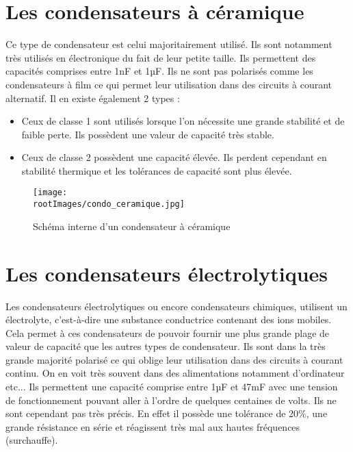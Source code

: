 \newpage
\section{Les condensateurs à céramique}

Ce type de condensateur est celui majoritairement utilisé. Ils sont notamment très utilisés en électronique du fait de leur petite taille. Ils permettent des capacités comprises entre 1nF et 1µF. Ils ne sont pas polarisés comme les condensateurs à film ce qui permet leur utilisation dans des circuits à courant alternatif. Il en existe également 2 types :\\

\begin{itemize}
    \item Ceux de classe 1 sont utilisés lorsque l’on nécessite une grande stabilité et de faible perte. Ils possèdent une valeur de capacité très stable.\\
    \item Ceux de classe 2 possèdent une capacité élevée. Ils perdent cependant en stabilité thermique et les tolérances de capacité sont plus élevée.
\end{itemize}

\begin{figure}[!h]
    \centering
    \texttt{[image: \\rootImages/condo\_ceramique.jpg]}
    \caption{Schéma interne d'un condensateur à céramique}
\end{figure}


\newpage
\section{Les condensateurs électrolytiques}

Les condensateurs électrolytiques ou encore condensateurs chimiques, utilisent un électrolyte, c’est-à-dire une substance conductrice contenant des ions mobiles. Cela permet à ces condensateurs de pouvoir fournir une plus grande plage de valeur de capacité que les autres types de condensateur. Ils sont dans la très grande majorité polarisé ce qui oblige leur utilisation dans des circuits à courant continu. On en voit très souvent dans des alimentations notamment d'ordinateur etc... Ils permettent une capacité comprise entre 1µF et 47mF avec une tension de fonctionnement pouvant aller à l’ordre de quelques centaines de volts. Ils ne sont cependant pas très précis. En effet il possède une tolérance de 20\%, une grande résistance en série et réagissent très mal aux hautes fréquences (surchauffe). 


